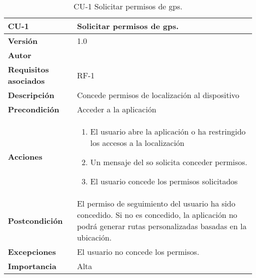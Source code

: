 \begin{table}[p]
	\centering
	\begin{tabularx}{\linewidth}{ p{} p{} }
		\toprule
		\textbf{CU-1}    & \textbf{Solicitar permisos de \acrshort{gps}.}\\
		\toprule
		\textbf{Versión}              & 1.0    \\
		\textbf{Autor}                & \autor \\
		\textbf{Requisitos asociados} & RF-1 \\
		\textbf{Descripción}          & Concede permisos de localización al dispositivo \\
		\textbf{Precondición}         & Acceder a la aplicación \\
		\textbf{Acciones}             &
		\begin{enumerate}
			\def\labelenumi{\arabic{enumi}.}
			\tightlist
			\item El usuario abre la aplicación o ha restringido los accesos a la localización
			\item Un mensaje del \acrfull{so} solicita conceder permisos.
			\item El usuario concede los permisos solicitados
		\end{enumerate}\\
		\textbf{Postcondición}        & El permiso de seguimiento del usuario ha sido concedido. Si no es concedido, la aplicación no podrá generar rutas personalizadas basadas en la ubicación. \\
		\textbf{Excepciones}          & El usuario no concede los permisos. \\
		\textbf{Importancia}          & Alta  \\
		\bottomrule
	\end{tabularx}
	\caption{CU-1 Solicitar permisos de \acrshort{gps}.}
\end{table}

